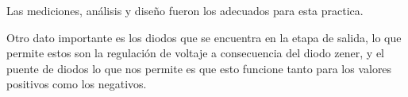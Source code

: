         Las mediciones, análisis y diseño fueron los adecuados para esta practica. 

        Otro dato importante es los diodos que se encuentra en la etapa de salida, lo que permite estos son la regulación de voltaje a consecuencia del diodo zener, y el puente de diodos lo que nos permite es que esto funcione tanto para los valores positivos como los negativos.
    


\newpage